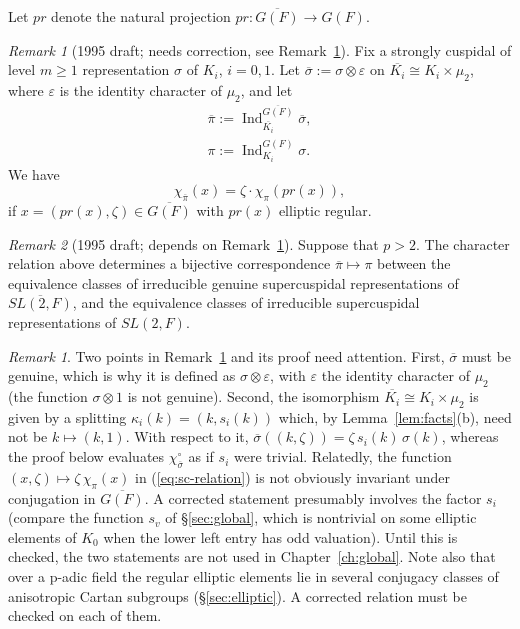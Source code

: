 \documentclass[12pt,letterpaper]{book}
\theoremstyle{plain}
\theoremstyle{definition}
\theoremstyle{remark}
\newtheorem{remark}[theorem]{Remark}
\theoremstyle{remark}
\newtheorem{remyy}{Remark}
\begin{document}
Let $pr$ denote the natural projection $pr:\overline{G(F)}\rightarrow G(F)$.

\begin{remyy}[1995 draft; needs correction, see Remark~\ref{rem:sc-caveat}] Fix a strongly cuspidal of level $m\geq 1$
representation $\sigma$ of $K_i$, $i=0,1$. Let
$\overline{\sigma}:=\sigma \otimes \varepsilon$ on
$\overline{K_i}\cong K_i\times \mu_2$, where $\varepsilon$ is the
identity character of $\mu_2$, and let
$$
\begin{array}{c}
\overline{\pi}
:=\operatorname{Ind}_{\overline{K_i}}^{\overline{G(F)}}\overline{\sigma},\\
\pi
:=\operatorname{Ind}_{K_i}^{G(F)}\sigma.
\end{array}
$$
We have
\begin{equation}
\chi_{\overline{\pi}}(x)=\zeta\cdot\chi_{\pi}(pr(x)),\label{eq:sc-relation}
\end{equation}
if $x=(pr(x),\zeta )\in \overline{G(F)}$ with $pr(x)$
elliptic regular.
\label{prop:164}
\end{remyy}

\begin{remyy}[1995 draft; depends on Remark~\ref{prop:164}] Suppose that $p>2$. The character relation above
determines a bijective correspondence
$\overline{\pi}\longmapsto \pi$
between the equivalence classes of irreducible genuine supercuspidal
representations of $\overline{SL(2,F)}$, and the equivalence
classes of irreducible supercuspidal representations of $SL(2,F)$.
\end{remyy}

\begin{remark}\label{rem:sc-caveat}
Two points in Remark~\ref{prop:164} and its proof need attention.
First, $\overline{\sigma}$ must be genuine, which is why it is defined as
$\sigma\otimes\varepsilon$, with $\varepsilon$ the identity character of
$\mu_2$ (the function $\sigma\otimes1$ is not genuine). Second, the isomorphism
$\overline{K_i}\cong K_i\times\mu_2$ is given by a splitting
$\kappa_i(k)=(k,s_i(k))$ which, by Lemma~\ref{lem:facts}(b), need not be
$k\mapsto(k,1)$. With respect to it,
$\overline{\sigma}((k,\zeta))=\zeta\, s_i(k)\,\sigma(k)$, whereas the proof
below evaluates $\chi_{\overline{\sigma}}^\circ$ as if $s_i$ were
trivial. Relatedly, the function $(x,\zeta)\mapsto\zeta\,\chi_\pi(x)$ in
(\ref{eq:sc-relation}) is not obviously invariant under conjugation in
$\overline{G(F)}$. A corrected statement presumably involves the factor
$s_i$ (compare the function $s_v$ of \S\ref{sec:global}, which is
nontrivial on some elliptic elements of $K_0$ when the lower left entry
has odd valuation). Until this is checked, the two statements are not used
in Chapter~\ref{ch:global}. Note also that over a p-adic field the
regular elliptic elements lie in several conjugacy classes of anisotropic
Cartan subgroups (\S\ref{sec:elliptic}). A corrected relation must be
checked on each of them.
\end{remark}
\end{document}
